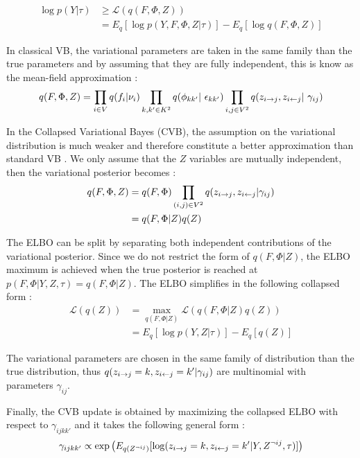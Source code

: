 \begin{align}
    \log p(Y | \tau) &\geq \mathcal{L}(q(F, \Phi, Z)) \\
    &= E_q[\log p(Y, F, \Phi, Z | \tau)] - E_q[\log q(F, \Phi, Z)] \nonumber \nonumber
\end{align}

In classical VB, the variational parameters are taken in the same family than the true parameters and by assuming that they are fully independent, this is know as the mean-field approximation :
\begin{equation}
q(F, \Phi, Z) = \prod_{i\in V}q(f_i | \nu_i) \prod_{k,k' \in K^2}q(\phi_{kk'} | \epsilon_{kk'})\prod_{i,j \in V^2}q(\zij, \zji | \gamma_{ij})
\end{equation}

In the Collapsed Variational Bayes (CVB), the assumption on the variational distribution is much weaker and therefore constitute a better approximation than standard VB \cite{teh2006collapsed}. We only assume that the $Z$ variables are mutually independent, then the variational posterior becomes : 
\begin{align}
q(F, \Phi, Z) &= q(F,\Phi) \prod_{(i,j)\in V^2}q(z_{i\rightarrow j}, z_{i\leftarrow j} | \gamma_{ij}) \\
	&= q(F, \Phi | Z)q(Z)
\end{align}

The ELBO can be split by separating both independent contributions of the variational posterior. Since we do not restrict the form of $q(F, \Phi | Z)$, the ELBO maximum is achieved when the true posterior is reached at $p(F, \Phi | Y, Z,  \tau) = q(F, \Phi | Z)$. The ELBO simplifies in the following collapsed form :
\begin{align}
    \mathcal{L}(q(Z)) &= \max_{q(F,\Phi|Z)} \mathcal{L}(q(F, \Phi|Z)q(Z)) \\
    &= E_q[\log p(Y,Z|\tau)] - E_q[q(Z)]
\end{align}

The variational parameters are chosen in the same family of distribution than the true distribution, thus $q(z_{i\rightarrow j}=k, z_{i\leftarrow j}=k' | \gamma_{ij})$ are multinomial with parameters $\gamma_{ij}$.

Finally, the CVB update is obtained by maximizing the collapsed ELBO with respect to $\gamma_{ijkk'}$ and it takes the following general form :
\begin{equation} \label{eq:cvb_update}
    \gamma_{ijkk'} \propto \exp \left( E_{q(Z^{\neg ij})} [\log(z_{i\rightarrow j}=k, z_{i\leftarrow j}=k' |Y, Z^{\neg ij}, \tau)] \right)
\end{equation}


